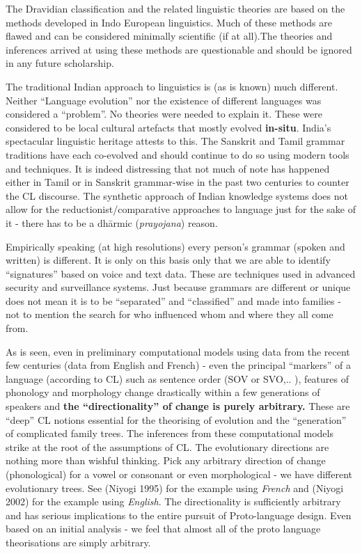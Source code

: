 The Dravidian classification and the related linguistic theories are based on the methods developed in Indo European linguistics. Much of these methods are flawed and can be considered minimally scientific (if at all).The theories and inferences arrived at using these methods are questionable and should be ignored in any future scholarship.

The traditional Indian approach to linguistics is (as is known) much different. Neither “Language evolution” nor the existence of different languages was considered a “problem”. No theories were needed to explain it. These were considered to be local cultural artefacts that mostly evolved \textbf{in-situ}. India’s spectacular linguistic heritage attests to this. The Sanskrit and Tamil grammar traditions have each co-evolved and should continue to do so using modern tools and techniques. It is indeed distressing that not much of note has happened either in Tamil or in Sanskrit grammar-wise in the past two centuries to counter the CL discourse. The synthetic approach of Indian knowledge systems does not allow for the reductionist/comparative approaches to language just for the sake of it - there has to be a dhārmic (\textit{prayojana}) reason.

Empirically speaking (at high resolutions) every person’s grammar (spoken and written) is different. It is only on this basis only that we are able to identify “signatures” based on voice and text data. These are techniques used in advanced security and surveillance systems. Just because grammars are different or unique does not mean it is to be “separated” and “classified” and made into families - not to mention the search for who influenced whom and where they all come from.

As is seen, even in preliminary computational models using data from the recent few centuries (data from English and French) - even the principal “markers” of a language (according to CL) such as sentence order (SOV or SVO,.. ), features of phonology and morphology change drastically within a few generations of speakers and \textbf{the “directionality” of change is purely arbitrary.} These are “deep” CL notions essential for the theorising of evolution and the “generation” of complicated family trees. The inferences from these computational models strike at the root of the assumptions of CL. The evolutionary directions are nothing more than wishful thinking. Pick any arbitrary direction of change (phonological) for a vowel or consonant or even morphological - we have different evolutionary trees. See (Niyogi 1995) for the example using \textit{French} and (Niyogi 2002) for the example using \textit{English}. The directionality is sufficiently arbitrary and has serious implications to the entire pursuit of Proto-language design. Even based on an initial analysis - we feel that almost all of the proto language theorisations are simply arbitrary.

